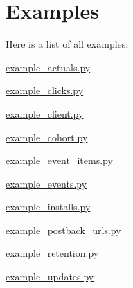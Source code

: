 \section{Examples}
Here is a list of all examples\-:\begin{DoxyCompactItemize}
\item 
\hyperlink{example_actuals_8py-example}{example\-\_\-actuals.\-py}
\item 
\hyperlink{example_clicks_8py-example}{example\-\_\-clicks.\-py}
\item 
\hyperlink{example_client_8py-example}{example\-\_\-client.\-py}
\item 
\hyperlink{example_cohort_8py-example}{example\-\_\-cohort.\-py}
\item 
\hyperlink{example_event_items_8py-example}{example\-\_\-event\-\_\-items.\-py}
\item 
\hyperlink{example_events_8py-example}{example\-\_\-events.\-py}
\item 
\hyperlink{example_installs_8py-example}{example\-\_\-installs.\-py}
\item 
\hyperlink{example_postback_urls_8py-example}{example\-\_\-postback\-\_\-urls.\-py}
\item 
\hyperlink{example_retention_8py-example}{example\-\_\-retention.\-py}
\item 
\hyperlink{example_updates_8py-example}{example\-\_\-updates.\-py}
\end{DoxyCompactItemize}
